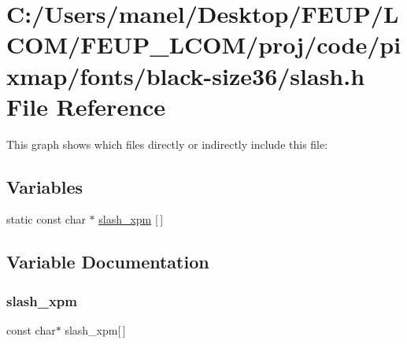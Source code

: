 \hypertarget{black-size36_2slash_8h}{}\section{C\+:/\+Users/manel/\+Desktop/\+F\+E\+U\+P/\+L\+C\+O\+M/\+F\+E\+U\+P\+\_\+\+L\+C\+O\+M/proj/code/pixmap/fonts/black-\/size36/slash.h File Reference}
\label{black-size36_2slash_8h}
This graph shows which files directly or indirectly include this file\+:
\subsection*{Variables}
\begin{DoxyCompactItemize}
\item 
static const char $\ast$ \mbox{\hyperlink{black-size36_2slash_8h_a75aeb3cbc2201956b5a6be0228f5b2b2}{slash\+\_\+xpm}} \mbox{[}$\,$\mbox{]}
\end{DoxyCompactItemize}


\subsection{Variable Documentation}
\mbox{\label{black-size36_2slash_8h_a75aeb3cbc2201956b5a6be0228f5b2b2}} 
\subsubsection{\texorpdfstring{slash\_xpm}{slash\_xpm}}
{\footnotesize\ttfamily const char$\ast$ slash\+\_\+xpm\mbox{[}$\,$\mbox{]}\hspace{0.3cm}{\ttfamily [static]}}

